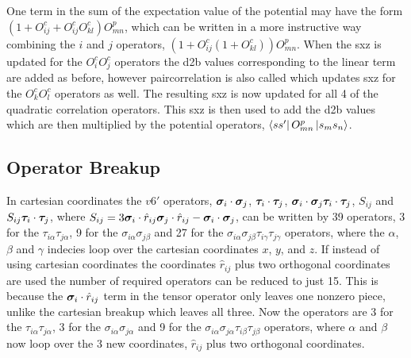 One term in the sum of the expectation value of the potential may have the form $\left(1+O^c_{ij}+O^c_{ij}O^c_{kl}\right)O^p_{mn}$, which can be written in a more instructive way combining the $i$ and $j$ operators, $\left(1+O^c_{ij}\left(1+O^c_{kl}\right)\right)O^p_{mn}$. When the sxz is updated for the $O^c_iO^c_j$ operators the d2b values corresponding to the linear term are added as before, however paircorrelation is also called which updates sxz for the $O^c_kO^c_l$ operators as well. The resulting sxz is now updated for all 4 of the quadratic correlation operators. This sxz is then used to add the d2b values which are then multiplied by the potential operators, $\left< ss' \right|O^p_{mn}\left| s_ms_n \right>$.

\subsection{Operator Breakup}
In cartesian coordinates the $v6'$ operators, $\bm{\sigma}_i\cdot\bm{\sigma}_j$, $\bm{\tau}_i\cdot\bm{\tau}_j$, $\bm{\sigma}_i\cdot\bm{\sigma}_j \bm{\tau}_i\cdot\bm{\tau}_j$, $S_{ij}$ and $S_{ij} \bm{\tau}_i\cdot\bm{\tau}_j$, where $S_{ij} = 3\bm{\sigma}_i\cdot\hat{r}_{ij}\bm{\sigma}_j\cdot\hat{r}_{ij}-\bm{\sigma}_i\cdot\bm{\sigma}_j$, can be written by 39 operators, 3 for the $\tau_{i\alpha}\tau_{j\alpha}$, 9 for the $\sigma_{i\alpha}\sigma_{j\beta}$ and 27 for the $\sigma_{i\alpha}\sigma_{j\beta}\tau_{i\gamma}\tau_{j\gamma}$ operators, where the $\alpha$, $\beta$ and $\gamma$ indecies loop over the cartesian coordinates $x$, $y$, and $z$. If instead of using cartesian coordinates the coordinates $\hat{r}_{ij}$ plus two orthogonal coordinates are used the number of required operators can be reduced to just 15. This is because the $\bm{\sigma}_i\cdot\hat{r}_{ij}$ term in the tensor operator only leaves one nonzero piece, unlike the cartesian breakup which leaves all three. Now the operators are 3 for the $\tau_{i\alpha}\tau_{j\alpha}$, 3 for the $\sigma_{i\alpha}\sigma_{j\alpha}$ and 9 for the $\sigma_{i\alpha}\sigma_{j\alpha}\tau_{i\beta}\tau_{j\beta}$ operators, where $\alpha$ and $\beta$ now loop over the 3 new coordinates, $\hat{r}_{ij}$ plus two orthogonal coordinates.
